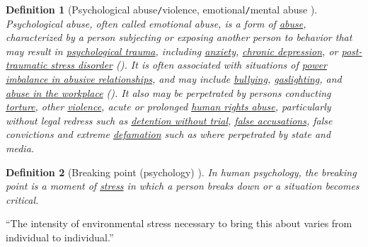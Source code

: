 \documentclass[12pt]{article}
\numberwithin{equation}{section}
\newtheorem{definition}{Definition}[section]
\begin{document}
\begin{definition}[Psychological abuse\texttt{/}violence, emotional\texttt{/}mental abuse \cite{Psychology Wiki/Abusive relationship,Wikipedia/Psychological abuse}]
    \emph{Psychological abuse}, often called \emph{emotional abuse}, is a form of \href{https://en.wikipedia.org/wiki/Abuse}{abuse}, characterized by a person subjecting or exposing another person to behavior that may result in \href{https://en.wikipedia.org/wiki/Psychological_trauma}{psychological trauma}, including \href{https://en.wikipedia.org/wiki/Anxiety_disorder}{anxiety}, \href{https://en.wikipedia.org/wiki/Chronic_depression}{chronic depression}, or \href{https://en.wikipedia.org/wiki/Post-traumatic_stress_disorder}{post-traumatic stress disorder} (\cite{Dutton1994,Dutton_Goodman_Bennett2000,Thompson_Kaplan1996}). It is often associated with situations of \href{https://en.wikipedia.org/wiki/Abusive_power_and_control}{power imbalance in abusive relationships}, and may include \href{https://en.wikipedia.org/wiki/Bullying}{bullying}, \href{https://en.wikipedia.org/wiki/Gaslighting}{gaslighting}, and \href{https://en.wikipedia.org/wiki/Workplace_bullying}{abuse in the workplace} (\cite{Dutton_Goodman_Bennett2000,Thompson_Kaplan1996}). It also may be perpetrated by persons conducting \href{https://en.wikipedia.org/wiki/Torture}{torture}, other \href{https://en.wikipedia.org/wiki/Violence}{violence}, acute or prolonged \href{https://en.wikipedia.org/wiki/Human_rights_abuse}{human rights abuse}, particularly without legal redress such as \href{https://en.wikipedia.org/wiki/Detention_without_trial}{detention without trial}, \href{https://en.wikipedia.org/wiki/False_accusation}{false accusations}, false convictions and extreme \href{https://en.wikipedia.org/wiki/Defamation}{defamation} such as where perpetrated by state and media. 
\end{definition}

\begin{definition}[Breaking point (psychology) \cite{Wikepedia/Breaking point (psychology)}]
    In human psychology, the \emph{breaking point} is a moment of \href{https://en.wikipedia.org/wiki/Stress_(medicine)}{stress} in which a person breaks down or a situation becomes critical.
\end{definition}
``The intensity of environmental stress necessary to bring this about varies from individual to individual.''
\end{document}

